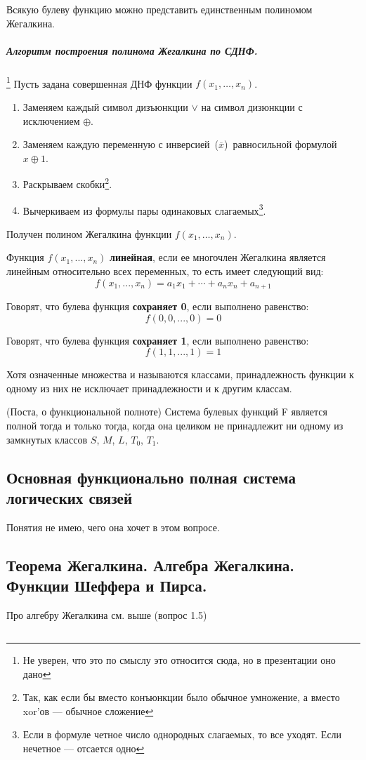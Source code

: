 \documentclass[14pt, a4paper]{extarticle}
\begin{document}
\begin{itemize}
  Всякую булеву функцию можно представить единственным полиномом Жегалкина.

  \subparagraph{Алгоритм построения полинома Жегалкина по СДНФ.}\footnote{Не уверен, что это по смыслу это относится сюда, но в презентации оно дано}
    Пусть задана совершенная ДНФ функции $f(x_1, \dots, x_n)$.
    \begin{enumerate}
    \item Заменяем каждый символ дизъюнкции $\lor$ на символ дизюнкции с исключением $\oplus$.
    \item Заменяем каждую переменную с инверсией ($\overline x$) равносильной формулой $x \oplus 1$.
    \item Раскрываем скобки\footnote{Так, как если бы вместо конъюнкции было обычное умножение, а вместо xor'ов --- обычное сложение}.
    \item Вычеркиваем из формулы пары одинаковых слагаемых\footnote{Если в формуле четное число однородных слагаемых, то все уходят. Если нечетное --- отсается одно}.
    \end{enumerate}
    Получен полином Жегалкина функции $f(x_1, \dots, x_n)$.

    \begin{defin}
      Функция $f(x_1, ..., x_n)$ \textbf{линейная}, если ее многочлен Жегалкина является линейным относительно всех переменных, то есть имеет следующий вид:
      $$ f(x_1, ..., x_n) = a_1x_1 + \cdots + a_nx_n + a_{n+1} $$
    \end{defin}

  \begin{defin}
    Говорят, что булева функция \textbf{сохраняет 0}, если выполнено равенство:
    $$ f(0, 0, ..., 0) = 0 $$
  \end{defin}

  \begin{defin}
    Говорят, что булева функция \textbf{сохраняет 1}, если выполнено равенство:
    $$ f(1, 1, ..., 1) = 1 $$
  \end{defin}
\end{itemize}

Хотя означенные множества и называются классами, принадлежность функции к одному из них не исключает принадлежности и к другим классам.

\begin{theorem}
  (Поста, о функциональной полноте) Система булевых функций F является полной тогда и только тогда, когда она целиком не принадлежит ни одному из замкнутых классов $S$, $M$, $L$, $T_{0}$, $T_{1}$.
\end{theorem}

\subsection{Основная функционально полная система логических связей}
Понятия не имею, чего она хочет в этом вопросе.

\subsection{Теорема Жегалкина. Алгебра Жегалкина. Функции Шеффера и Пирса.}
Про алгебру Жегалкина см. выше (вопрос 1.5)
\subsection{}
\end{document}
